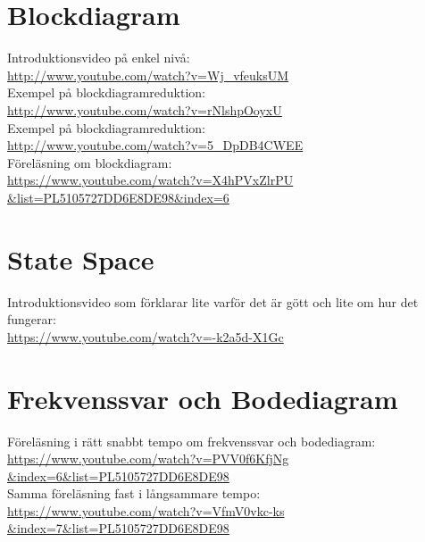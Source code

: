 \documentclass[a4paper]{article}
\begin{document}
\section{Blockdiagram}
Introduktionsvideo på enkel nivå:\\
\href{http://www.youtube.com/watch?v=Wj_vfeuksUM}{http://www.youtube.com/watch?v=Wj\_vfeuksUM}\\

Exempel på blockdiagramreduktion:\\
\href{http://www.youtube.com/watch?v=rNlshpOoyxU}{http://www.youtube.com/watch?v=rNlshpOoyxU}\\

Exempel på blockdiagramreduktion:\\
\href{http://www.youtube.com/watch?v=5_DpDB4CWEE}{http://www.youtube.com/watch?v=5\_DpDB4CWEE}\\

Föreläsning om blockdiagram:\\
\href{https://www.youtube.com/watch?v=X4hPVxZlrPU&list=PL5105727DD6E8DE98&index=6}{https://www.youtube.com/watch?v=X4hPVxZlrPU\\\&list=PL5105727DD6E8DE98\&index=6}


\section{State Space}
Introduktionsvideo som förklarar lite varför det är gött och lite om hur det fungerar:\\
\href{https://www.youtube.com/watch?v=-k2a5d-X1Gc}{https://www.youtube.com/watch?v=-k2a5d-X1Gc}


\section{Frekvenssvar och Bodediagram}
Föreläsning i rätt snabbt tempo om frekvenssvar och bodediagram:\\
\href{https://www.youtube.com/watch?v=PVV0f6KfjNg&index=6&list=PL5105727DD6E8DE98}{https://www.youtube.com/watch?v=PVV0f6KfjNg\\\&index=6\&list=PL5105727DD6E8DE98}\\

Samma föreläsning fast i långsammare tempo:\\
\href{https://www.youtube.com/watch?v=VfmV0vkc-ks&index=7&list=PL5105727DD6E8DE98}{https://www.youtube.com/watch?v=VfmV0vkc-ks\\\&index=7\&list=PL5105727DD6E8DE98}\\
\end{document}
